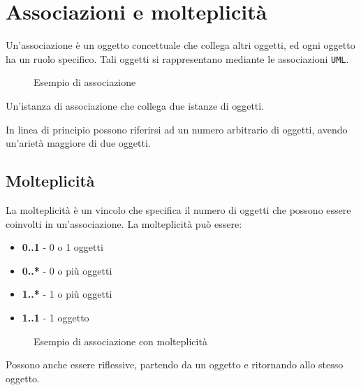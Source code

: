 \section{Associazioni e molteplicità}
\begin{tcolorbox}[colback=blue!5!white,colframe=blue!75!black, title=Associazioni]
    Un'associazione è un oggetto concettuale che collega altri oggetti, ed ogni 
    oggetto ha un ruolo specifico. Tali oggetti si rappresentano mediante 
    le associazioni \texttt{UML}.
\end{tcolorbox}
\begin{figure}[H]
    \centering
    \caption{Esempio di associazione}
\end{figure}
\begin{tcolorbox}[colback=blue!5!white,colframe=blue!75!black, title=Istanza di associazione]
    Un'istanza di associazione che collega due istanze di oggetti.
\end{tcolorbox}
In linea di principio possono riferirsi ad un numero arbitrario di oggetti, avendo un'arietà maggiore 
di due oggetti.
\subsection{Molteplicità}
La molteplicità è un vincolo che specifica il numero di oggetti che possono essere coinvolti
in un'associazione. La molteplicità può essere:
\begin{itemize}
    \item \textbf{0..1} - 0 o 1 oggetti
    \item \textbf{0..*} - 0 o più oggetti
    \item \textbf{1..*} - 1 o più oggetti
    \item \textbf{1..1} - 1 oggetto
\end{itemize}
\begin{figure}[H]
    \centering
    \caption{Esempio di associazione con molteplicità}
\end{figure}
Possono anche essere riflessive, partendo da un oggetto e ritornando allo stesso oggetto.

